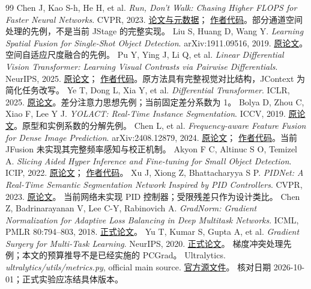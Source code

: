 \documentclass[UTF8,a4paper,11pt,fontset=windows]{ctexart}
\begin{document}
\begin{thebibliography}{99}
 Chen J, Kao S-h, He H, et al.
\textit{Run, Don't Walk: Chasing Higher FLOPS for Faster Neural Networks}. CVPR, 2023.
\href{https://arxiv.org/abs/2303.03667}{论文与元数据}；
\href{https://github.com/JierunChen/FasterNet}{作者代码}。部分通道空间处理的先例，不是当前 JStage 的完整实现。
 Liu S, Huang D, Wang Y.
\textit{Learning Spatial Fusion for Single-Shot Object Detection}. arXiv:1911.09516, 2019.
\href{https://arxiv.org/abs/1911.09516}{原论文}。空间自适应尺度融合的先例。
 Pu Y, Ying J, Li Q, et al.
\textit{Linear Differential Vision Transformer: Learning Visual Contrasts via Pairwise Differentials}.
NeurIPS, 2025. \href{https://arxiv.org/abs/2511.00833}{原论文}；
\href{https://github.com/LeapLabTHU/LinearDiff}{作者代码}。原方法具有完整视觉对比结构，JContext 为简化任务改写。
 Ye T, Dong L, Xia Y, et al.
\textit{Differential Transformer}. ICLR, 2025.
\href{https://arxiv.org/abs/2410.05258}{原论文}。差分注意力思想先例；当前固定差分系数为 1。
 Bolya D, Zhou C, Xiao F, Lee Y J.
\textit{YOLACT: Real-Time Instance Segmentation}. ICCV, 2019.
\href{https://arxiv.org/abs/1904.02689}{原论文}。原型和实例系数的分解先例。
 Chen L, et al.
\textit{Frequency-aware Feature Fusion for Dense Image Prediction}. arXiv:2408.12879, 2024.
\href{https://arxiv.org/abs/2408.12879}{原论文}；
\href{https://github.com/ying-fu/FreqFusion}{作者代码}。当前 JFusion 未实现其完整频率感知与校正机制。
 Akyon F C, Altinuc S O, Temizel A.
\textit{Slicing Aided Hyper Inference and Fine-tuning for Small Object Detection}.
ICIP, 2022. \href{https://arxiv.org/abs/2202.06934}{原论文}；
\href{https://github.com/obss/sahi}{作者代码}。
 Xu J, Xiong Z, Bhattacharyya S P.
\textit{PIDNet: A Real-Time Semantic Segmentation Network Inspired by PID Controllers}.
CVPR, 2023. \href{https://arxiv.org/abs/2206.02066}{原论文}。
当前网络未实现 PID 控制器；受限残差只作为设计类比。
 Chen Z, Badrinarayanan V, Lee C-Y, Rabinovich A.
\textit{GradNorm: Gradient Normalization for Adaptive Loss Balancing in Deep Multitask Networks}.
ICML, PMLR 80:794--803, 2018. \href{https://proceedings.mlr.press/v80/chen18a.html}{正式论文}。
 Yu T, Kumar S, Gupta A, et al.
\textit{Gradient Surgery for Multi-Task Learning}. NeurIPS, 2020.
\href{https://proceedings.neurips.cc/paper_files/paper/2020/hash/3fe78a8acf5fda99de95303940a2420c-Abstract.html}{正式论文}。
梯度冲突处理先例；本文的预算推导不是已经实施的 PCGrad。
 Ultralytics.
\textit{ultralytics/utils/metrics.py}, official main source.
\href{https://github.com/ultralytics/ultralytics/blob/main/ultralytics/utils/metrics.py}{官方源文件}。
核对日期 2026-10-01；正式实验应冻结具体版本。
\end{thebibliography}
\normalsize
\clearpage
\end{document}
